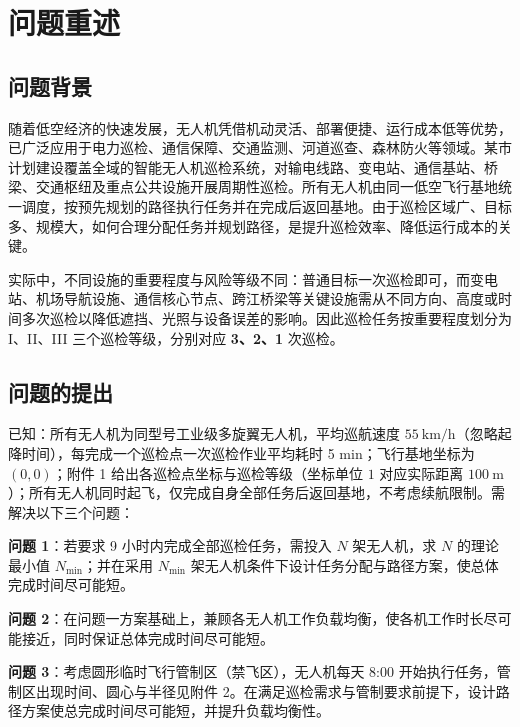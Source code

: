 \documentclass[12pt,a4paper]{ctexart}
\begin{document}
\pagestyle{body}

\section{问题重述}

\subsection{问题背景}

随着低空经济的快速发展，无人机凭借机动灵活、部署便捷、运行成本低等优势，已广泛应用于电力巡检、通信保障、交通监测、河道巡查、森林防火等领域。某市计划建设覆盖全域的智能无人机巡检系统，对输电线路、变电站、通信基站、桥梁、交通枢纽及重点公共设施开展周期性巡检。所有无人机由同一低空飞行基地统一调度，按预先规划的路径执行任务并在完成后返回基地。由于巡检区域广、目标多、规模大，如何合理分配任务并规划路径，是提升巡检效率、降低运行成本的关键。

实际中，不同设施的重要程度与风险等级不同：普通目标一次巡检即可，而变电站、机场导航设施、通信核心节点、跨江桥梁等关键设施需从不同方向、高度或时间多次巡检以降低遮挡、光照与设备误差的影响。因此巡检任务按重要程度划分为 I、II、III 三个巡检等级，分别对应 \textbf{3、2、1} 次巡检。

\subsection{问题的提出}

已知：所有无人机为同型号工业级多旋翼无人机，平均巡航速度 $55\ \mathrm{km/h}$（忽略起降时间），每完成一个巡检点一次巡检作业平均耗时 5 min；飞行基地坐标为 $(0,0)$；附件 1 给出各巡检点坐标与巡检等级（坐标单位 $1$ 对应实际距离 $100\ \mathrm{m}$）；所有无人机同时起飞，仅完成自身全部任务后返回基地，不考虑续航限制。需解决以下三个问题：

\textbf{问题 1}：若要求 9 小时内完成全部巡检任务，需投入 $N$ 架无人机，求 $N$ 的理论最小值 $N_{\min}$；并在采用 $N_{\min}$ 架无人机条件下设计任务分配与路径方案，使总体完成时间尽可能短。

\textbf{问题 2}：在问题一方案基础上，兼顾各无人机工作负载均衡，使各机工作时长尽可能接近，同时保证总体完成时间尽可能短。

\textbf{问题 3}：考虑圆形临时飞行管制区（禁飞区），无人机每天 8:00 开始执行任务，管制区出现时间、圆心与半径见附件 2。在满足巡检需求与管制要求前提下，设计路径方案使总完成时间尽可能短，并提升负载均衡性。
\end{document}
